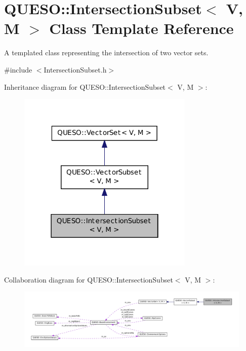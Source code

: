 \hypertarget{class_q_u_e_s_o_1_1_intersection_subset}{\section{Q\-U\-E\-S\-O\-:\-:Intersection\-Subset$<$ V, M $>$ Class Template Reference}
\label{class_q_u_e_s_o_1_1_intersection_subset}
}


A templated class representing the intersection of two vector sets.  




{\ttfamily \#include $<$Intersection\-Subset.\-h$>$}



Inheritance diagram for Q\-U\-E\-S\-O\-:\-:Intersection\-Subset$<$ V, M $>$\-:
\nopagebreak
\begin{figure}[H]
\begin{center}
\leavevmode
\includegraphics[width=238pt]{class_q_u_e_s_o_1_1_intersection_subset__inherit__graph}
\end{center}
\end{figure}


Collaboration diagram for Q\-U\-E\-S\-O\-:\-:Intersection\-Subset$<$ V, M $>$\-:
\nopagebreak
\begin{figure}[H]
\begin{center}
\leavevmode
\includegraphics[width=350pt]{class_q_u_e_s_o_1_1_intersection_subset__coll__graph}
\end{center}
\end{figure}
